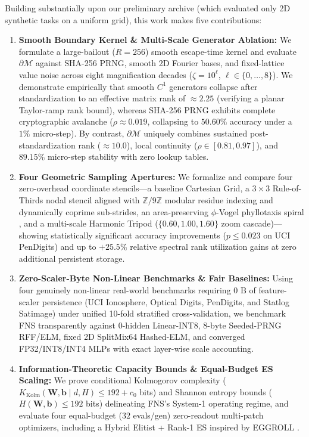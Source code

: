 Building substantially upon our preliminary archive \cite{dagli2026fns_zenodo} (which evaluated only 2D synthetic tasks on a uniform grid), this work makes five contributions:
\begin{enumerate}
    \item \textbf{Smooth Boundary Kernel \& Multi-Scale Generator Ablation:} We formulate a large-bailout ($R=256$) smooth escape-time kernel and evaluate $\partial\mathcal{M}$ against SHA-256 PRNG, smooth 2D Fourier bases, and fixed-lattice value noise across eight magnification decades ($\zeta = 10^\ell$, $\ell \in \{0,\dots,8\}$). We demonstrate empirically that smooth $C^1$ generators collapse after standardization to an effective matrix rank of $\approx 2.25$ (verifying a planar Taylor-ramp rank bound), whereas SHA-256 PRNG exhibits complete cryptographic avalanche ($\rho \approx 0.019$, collapsing to $50.60\%$ accuracy under a $1\%$ micro-step). By contrast, $\partial\mathcal{M}$ uniquely combines sustained post-standardization rank ($\approx 10.0$), local continuity ($\rho \in [0.81, 0.97]$), and $89.15\%$ micro-step stability with zero lookup tables.
    \item \textbf{Four Geometric Sampling Apertures:} We formalize and compare four zero-overhead coordinate stencils---a baseline Cartesian Grid, a $3\times 3$ Rule-of-Thirds nodal stencil aligned with $\mathbb{Z}/9\mathbb{Z}$ modular residue indexing and dynamically coprime sub-strides, an area-preserving $\phi$-Vogel phyllotaxis spiral \cite{vogel1979better}, and a multi-scale Harmonic Tripod ($\{0.60, 1.00, 1.60\}$ zoom cascade)---showing statistically significant accuracy improvements ($p \le 0.023$ on UCI PenDigits) and up to $+25.5\%$ relative spectral rank utilization gains at zero additional persistent storage.
    \item \textbf{Zero-Scaler-Byte Non-Linear Benchmarks \& Fair Baselines:} Using four genuinely non-linear real-world benchmarks requiring $0\text{ B}$ of feature-scaler persistence (UCI Ionosphere, Optical Digits, PenDigits, and Statlog Satimage) under unified 10-fold stratified cross-validation, we benchmark FNS transparently against $0\text{-hidden}$ Linear-INT8, $8\text{-byte}$ Seeded-PRNG RFF/ELM, fixed 2D SplitMix64 Hashed-ELM, and converged FP32/INT8/INT4 MLPs with exact layer-wise scale accounting.
    \item \textbf{Information-Theoretic Capacity Bounds \& Equal-Budget ES Scaling:} We prove conditional Kolmogorov complexity ($K_{\mathrm{Kolm}}(\mathbf{W},\mathbf{b}\mid d,H) \le 192 + c_0$ bits) and Shannon entropy bounds ($H(\mathbf{W},\mathbf{b}) \le 192$ bits) delineating FNS's System-1 operating regime, and evaluate four equal-budget ($32$ evals/gen) zero-readout multi-patch optimizers, including a Hybrid Elitist + Rank-1 ES inspired by EGGROLL \cite{sarkar2025eggroll}.

\end{enumerate}
